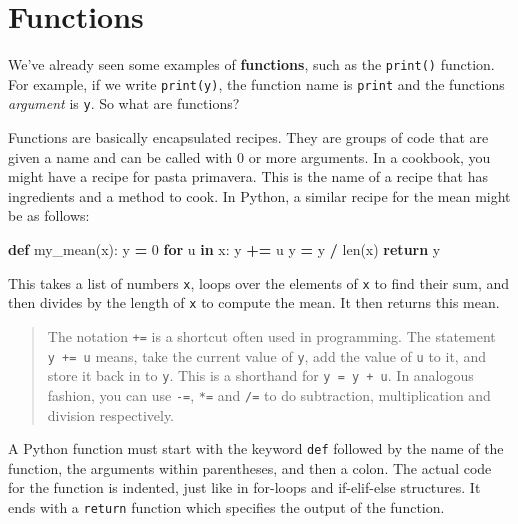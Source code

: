 \documentclass[
  letterpaper,
]{scrbook}
\newenvironment{Shaded}{\begin{snugshade}}{\end{snugshade}}
\newcommand{\BuiltInTok}[1]{#1}
\newcommand{\ControlFlowTok}[1]{\textcolor[rgb]{0.13,0.29,0.53}{\textbf{#1}}}
\newcommand{\DecValTok}[1]{\textcolor[rgb]{0.00,0.00,0.81}{#1}}
\newcommand{\KeywordTok}[1]{\textcolor[rgb]{0.13,0.29,0.53}{\textbf{#1}}}
\newcommand{\NormalTok}[1]{#1}
\newcommand{\OperatorTok}[1]{\textcolor[rgb]{0.81,0.36,0.00}{\textbf{#1}}}
\begin{document}
\hypertarget{functions}{%
\section{Functions}\label{functions}}

We've already seen some examples of \textbf{functions}, such as the \texttt{print()} function. For example, if we write \texttt{print(y)}, the function name is \texttt{print} and the functions \emph{argument} is \texttt{y}. So what are functions?

Functions are basically encapsulated recipes. They are groups of code that are given a name and can be called with 0 or more arguments. In a cookbook, you might have a recipe for pasta primavera. This is the name of a recipe that has ingredients and a method to cook. In Python, a similar recipe for the mean might be as follows:

\begin{Shaded}
\begin{Highlighting}[]
\KeywordTok{def}\NormalTok{ my_mean(x):}
\NormalTok{    y }\OperatorTok{=} \DecValTok{0}
    \ControlFlowTok{for}\NormalTok{ u }\KeywordTok{in}\NormalTok{ x:}
\NormalTok{        y }\OperatorTok{+=}\NormalTok{ u }
\NormalTok{    y }\OperatorTok{=}\NormalTok{ y }\OperatorTok{/} \BuiltInTok{len}\NormalTok{(x)}
    \ControlFlowTok{return}\NormalTok{ y}
\end{Highlighting}
\end{Shaded}

This takes a list of numbers \texttt{x}, loops over the elements of \texttt{x} to find their sum, and then divides by the length of \texttt{x} to compute the mean. It then returns this mean.

\begin{quote}
The notation \texttt{+=} is a shortcut often used in programming. The statement \texttt{y\ +=\ u} means, take the current value of \texttt{y}, add the value of \texttt{u} to it, and store it back in to \texttt{y}. This is a shorthand for \texttt{y\ =\ y\ +\ u}. In analogous fashion, you can use \texttt{-=}, \texttt{*=} and \texttt{/=} to do subtraction, multiplication and division respectively.
\end{quote}

A Python function must start with the keyword \texttt{def} followed by the name of the function, the arguments within parentheses, and then a colon. The actual code for the function is indented, just like in for-loops and if-elif-else structures. It ends with a \texttt{return} function which specifies the output of the function.
\end{document}
